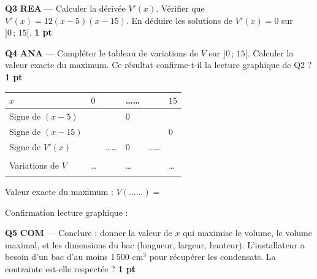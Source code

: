 \documentclass[a4paper,11pt]{article}
\newcommand{\pts}[1]{\hfill\textcolor{gris}{\small\textbf{#1}}}
\newcommand{\comp}[1]{\colorbox{blue!10}{\scriptsize\textbf{#1}}}
\begin{document}
\textbf{Q3} \comp{REA} — Calculer la dérivée $V'(x)$. Vérifier que $V'(x) = 12(x - 5)(x - 15)$. En déduire les solutions de $V'(x) = 0$ sur $]0\,;\,15[$. \pts{1 pt}

\begin{reponsebox}[3.5cm]
\dotfill

\dotfill

\dotfill

\dotfill
\end{reponsebox}

\textbf{Q4} \comp{ANA} — Compléter le tableau de variations de $V$ sur $]0\,;\,15[$. Calculer la valeur exacte du maximum. Ce résultat confirme-t-il la lecture graphique de Q2 ? \pts{1 pt}

\begin{center}
\renewcommand{\arraystretch}{1.6}
\begin{tabular}{|>{\centering\arraybackslash}m{2.5cm}|>{\centering\arraybackslash}m{1.2cm}|>{\centering\arraybackslash}m{1.8cm}|>{\centering\arraybackslash}m{1.2cm}|>{\centering\arraybackslash}m{1.8cm}|>{\centering\arraybackslash}m{1.2cm}|}
\hline
$x$ & $0$ & & \ldots\ldots & & $15$ \\
\hline
Signe de $(x - 5)$ & & & $0$ & & \\
\hline
Signe de $(x - 15)$ & & & & & $0$ \\
\hline
Signe de $V'(x)$ & & \ldots\ldots & $0$ & \ldots\ldots & \\
\hline
& & & & & \\[6pt]
Variations de $V$ & \ldots & & \ldots & & \ldots \\[6pt]
& & & & & \\
\hline
\end{tabular}
\renewcommand{\arraystretch}{1}
\end{center}

\vspace{4pt}
Valeur exacte du maximum : $V(\ldots\ldots) = $ \dotfill

\vspace{4pt}
Confirmation lecture graphique : \dotfill

\textbf{Q5} \comp{COM} — Conclure : donner la valeur de $x$ qui maximise le volume, le volume maximal, et les dimensions du bac (longueur, largeur, hauteur). L'installateur a besoin d'un bac d'au moins 1\,500 cm$^3$ pour récupérer les condensats. La contrainte est-elle respectée ? \pts{1 pt}

\begin{reponsebox}[4cm]
\dotfill

\dotfill

\dotfill

\dotfill

\dotfill
\end{reponsebox}
\end{document}
